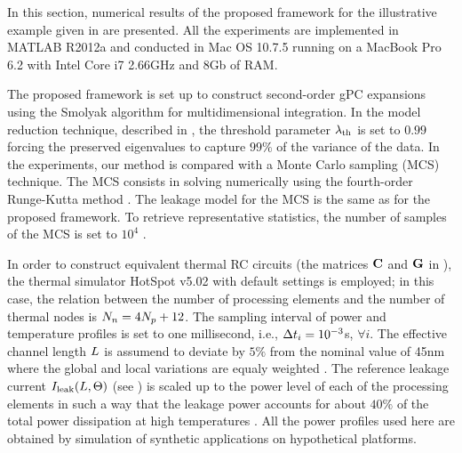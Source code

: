 In this section, numerical results of the proposed framework for the illustrative example given in  are presented. All the experiments are implemented in MATLAB R2012a \cite{matlab} and conducted in Mac OS 10.7.5 running on a MacBook Pro 6.2 with Intel Core i7 2.66GHz and 8Gb of RAM.

The proposed framework is set up to construct second-order gPC expansions using the Smolyak algorithm for multidimensional integration. In the model reduction technique, described in , the threshold parameter $\lambda_\text{th}$ is set to $0.99$ forcing the preserved eigenvalues to capture $99\%$ of the variance of the data. In the experiments, our method is compared with a Monte Carlo sampling (MCS) technique. The MCS consists in solving  numerically using the fourth-order Runge-Kutta method \cite{press2007}. The leakage model for the MCS is the same as for the proposed framework. To retrieve representative statistics, the number of samples of the MCS is set to $10^4$ \cite{xiu2009}.

In order to construct equivalent thermal RC circuits (the matrices $\mC$ and $\mG$ in ), the thermal simulator HotSpot v5.02 \cite{hotspot} with default settings is employed; in this case, the relation between the number of processing elements and the number of thermal nodes is ${N_n} = 4 {N_p} + 12$. The sampling interval of power and temperature profiles is set to one millisecond, i.e., $\Delta t_i = 10^{-3}$s, $\forall i$. The effective channel length $L$ is assumend to deviate by $5\%$ from the nominal value of 45nm where the global and local variations are equaly weighted \cite{juan2012}. The reference leakage current $I_{\text{leak}}(L, \Theta)$ (see ) is scaled up to the power level of each of the processing elements in such a way that the leakage power accounts for about $40\%$ of the total power dissipation at high temperatures \cite{liu2007}. All the power profiles used here are obtained by simulation of synthetic applications on hypothetical platforms.

